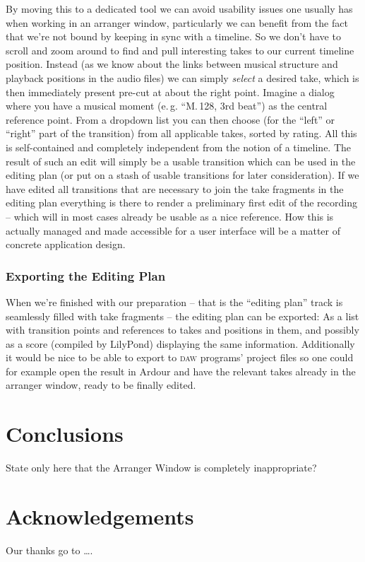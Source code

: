 \documentclass[11pt,a4paper]{article}
\begin{document}
By moving this to a dedicated tool we can avoid usability issues one usually has when working in an arranger window, particularly we can benefit from the fact that we're not bound by keeping in sync with a timeline.
So we don't have to scroll and zoom around to find and pull interesting takes to our current timeline position.
Instead (as we know about the links between musical structure and playback positions in the audio files) we can simply \emph{select} a desired take, which is then immediately present pre-cut at about the right point.
Imagine a dialog where you have a musical moment (e.\,g. “M.\,128, 3rd beat”) as the central reference point.
From a dropdown list you can then choose (for the “left” or “right” part of the transition) from all applicable takes, sorted by rating.
All this is self-contained and completely independent from the notion of a timeline.
The result of such an edit will simply be a usable transition which can be used in the editing plan (or put on a stash of usable transitions for later consideration).
If we have edited all transitions that are necessary to join the take fragments in the editing plan everything is there to render a preliminary first edit of the recording -- which will in most cases already be usable as a nice reference.
How this is actually managed and made accessible for a user interface will be a matter of concrete application design.

\subsubsection{Exporting the Editing Plan}

When we're finished with our preparation -- that is the “editing plan” track is seamlessly filled with take fragments -- the editing plan can be exported: As a list with transition points and references to takes and positions in them, and possibly as a score (compiled by LilyPond) displaying the same information.
Additionally it would be nice to be able to export to \textsc{daw} programs' project files so one could for example open the result in Ardour and have the relevant takes already in the arranger window, ready to be finally edited.


\section{Conclusions}

State only here that the Arranger Window is completely inappropriate?


\section{Acknowledgements}

Our thanks go to \ldots .
\end{document}
